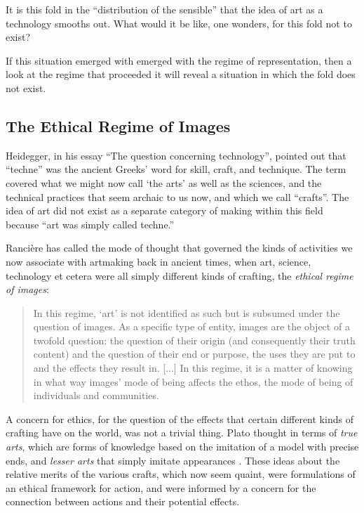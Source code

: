 \documentclass[letter:wpaper]{article}
\begin{document}
    It is this fold in the ``distribution of the sensible'' \citep[p.42]{RancierPltcsOfThAsthtcs2004} that the idea of art as a technology smooths out. What would it be like, one wonders, for this fold not to exist?
    
    If this situation emerged with emerged with the regime of representation, then a look at the regime that proceeded it will reveal a situation in which the fold does not exist.
    
    \subsection{The Ethical Regime of Images}

    Heidegger, in his essay ``The question concerning technology'', pointed out that ``techne'' was the ancient Greeks' word for skill, craft, and technique. The term covered what we might now call ‘the arts’ as well as the sciences, and the technical practices that seem archaic to us now, and which we call ``crafts''. The idea of art did not exist as a separate category of making within this field because ``art was simply called techne.'' \citep[p34]{HeideggerThQstnCncrngTchnlgy1954}
    
    Rancière has called the mode of thought that governed the kinds of activities we now associate with artmaking back in ancient times, when art, science, technology et cetera were all simply different kinds of crafting, the \emph{ethical regime of images}:

    \begin{quote}
        In this regime, ‘art’ is not identified as such but is subsumed under the question of images. As a specific type of entity, images are the object of a twofold question: the question of their origin (and consequently their truth content) and the question of their end or purpose, the uses they are put to and the effects they result in. [...] In this regime, it is a matter of knowing in what way images' mode of being affects the ethos, the mode of being of individuals and communities. \citep[pp.20–21]{RancierPltcsOfThAsthtcs2004}
    \end{quote}

    A concern for ethics, for the question of the effects that certain different kinds of crafting have on the world, was not a trivial thing. Plato thought in terms of \emph{true arts}, which are forms of knowledge based on the imitation of a model with precise ends, and \emph{lesser arts} that simply imitate appearances \citep[p.20]{RancierPltcsOfThAsthtcs2004}. These ideas about the relative merits of the various crafts, which now seem quaint, were formulations of an ethical framework for action, and were informed by a concern for the connection between actions and their potential effects.
\end{document}
